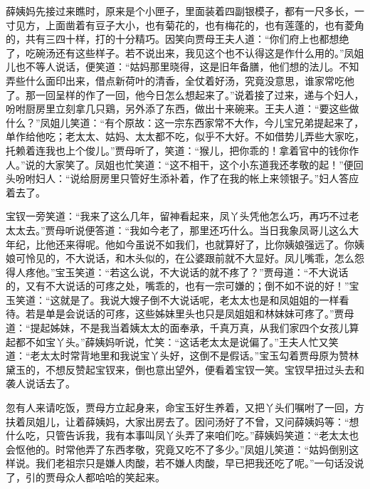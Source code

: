 \begin{parag}
    薛姨妈先接过来瞧时，原来是个小匣子，里面装着四副银模子，都有一尺多长，一寸见方，上面凿着有豆子大小，也有菊花的，也有梅花的，也有莲蓬的，也有菱角的，共有三四十样，打的十分精巧。因笑向贾母王夫人道：“你们府上也都想绝了，吃碗汤还有这些样子。若不说出来，我见这个也不认得这是作什么用的。”凤姐儿也不等人说话，便笑道：“姑妈那里晓得，这是旧年备膳，他们想的法儿。不知弄些什么面印出来，借点新荷叶的清香，全仗着好汤，究竟没意思，谁家常吃他了。那一回呈样的作了一回，他今日怎么想起来了。”说着接了过来，递与个妇人，吩咐厨房里立刻拿几只鶏，另外添了东西，做出十来碗来。王夫人道：“要这些做什么？”凤姐儿笑道：“有个原故：这一宗东西家常不大作，今儿宝兄弟提起来了，单作给他吃；老太太、姑妈、太太都不吃，似乎不大好。不如借势儿弄些大家吃，托赖着连我也上个俊儿。”贾母听了，笑道：“猴儿，把你乖的！拿着官中的钱你作人。”说的大家笑了。凤姐也忙笑道：“这不相干，这个小东道我还孝敬的起！”便回头吩咐妇人：“说给厨房里只管好生添补着，作了在我的帐上来领银子。”妇人答应着去了。
\end{parag}


\begin{parag}
    宝钗一旁笑道：“我来了这么几年，留神看起来，凤丫头凭他怎么巧，再巧不过老太太去。”贾母听说便答道：“我如今老了，那里还巧什么。当日我象凤哥儿这么大年纪，比他还来得呢。他如今虽说不如我们，也就算好了，比你姨娘强远了。你姨娘可怜见的，不大说话，和木头似的，在公婆跟前就不大显好。凤儿嘴乖，怎么怨得人疼他。”宝玉笑道：“若这么说，不大说话的就不疼了？”贾母道：“不大说话的，又有不大说话的可疼之处，嘴乖的，也有一宗可嫌的；倒不如不说的好！”宝玉笑道：“这就是了。我说大嫂子倒不大说话呢，老太太也是和凤姐姐的一样看待。若是单是会说话的可疼，这些姊妹里头也只是凤姐姐和林妹妹可疼了。”贾母道：“提起姊妹，不是我当着姨太太的面奉承，千真万真，从我们家四个女孩儿算起都不如宝丫头。”薛姨妈听说，忙笑：“这话老太太是说偏了。”王夫人忙又笑道：“老太太时常背地里和我说宝丫头好，这倒不是假话。”宝玉勾着贾母原为赞林黛玉的，不想反赞起宝钗来，倒也意出望外，便看着宝钗一笑。宝钗早扭过头去和袭人说话去了。
\end{parag}


\begin{parag}
    忽有人来请吃饭，贾母方立起身来，命宝玉好生养着，又把丫头们嘱咐了一回，方扶着凤姐儿，让着薛姨妈，大家出房去了。因问汤好了不曾，又问薛姨妈等：“想什么吃，只管告诉我，我有本事叫凤丫头弄了来咱们吃。”薛姨妈笑道：“老太太也会怄他的。时常他弄了东西孝敬，究竟又吃不了多少。”凤姐儿笑道：“姑妈倒别这样说。我们老祖宗只是嫌人肉酸，若不嫌人肉酸，早已把我还吃了呢。”一句话没说了，引的贾母众人都哈哈的笑起来。
\end{parag}


